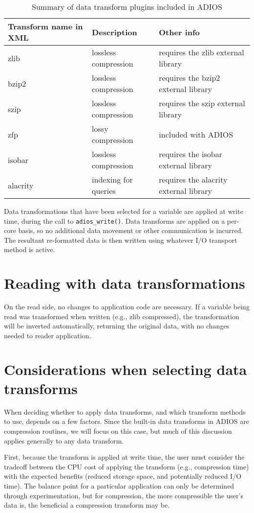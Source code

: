 \begin{table}%
\begin{tabular}{l|l|l}
\textbf{Transform name in XML} & \textbf{Description} & \textbf{Other info} \\
\hline
zlib & lossless compression & requires the zlib external library \\
\hline
bzip2 & lossless compression & requires the bzip2 external library \\
\hline
szip & lossless compression & requires the szip external library \\
\hline
zfp & lossy compression & included with ADIOS \\
\hline
isobar & lossless compression & requires the isobar external library \\
\hline
alacrity & indexing for queries & requires the alacrity external library \\
\end{tabular}
\caption{Summary of data transform plugins included in ADIOS}
\label{tbl:data-transforms-summary}
\end{table}

Data transformations that have been selected for a variable are applied at write time, during the call to \verb+adios_write()+.
Data transforms are applied on a per-core basis, so no additional data movement or other communication is incurred.
The resultant re-formatted data is then written using whatever I/O transport method is active.

\section{Reading with data transformations}
On the read side, no changes to application code are necessary. If a variable being read was transformed when written
(e.g., zlib compressed), the transformation will be inverted automatically, returning the original data,
with no changes needed to reader application.

\section{Considerations when selecting data transforms}
When deciding whether to apply data transforms, and which transform methods to use, depends on a few factors.
Since the built-in data transforms in ADIOS are compression routines, we will focus on this case, but much of
this discussion applies generally to any data transform.

First, because the transform is applied at write time, the user must consider the tradeoff between the CPU cost of applying
the transform (e.g., compression time) with the expected benefits (reduced storage space, and potentially reduced I/O time).
The balance point for a particular application can only be determined through experimentation, but for compression,
the more compressible the user's data is, the beneficial a compression transform may be.

